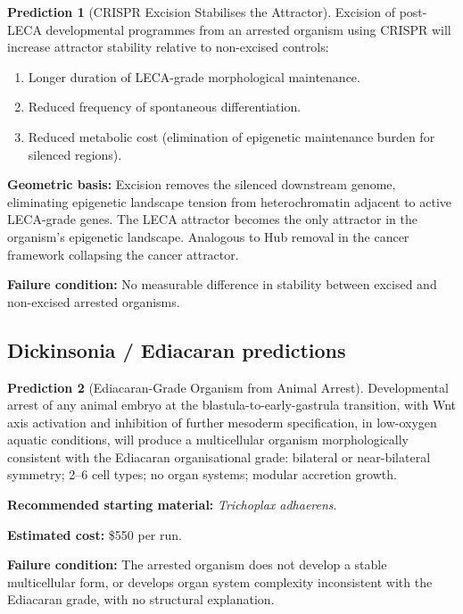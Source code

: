 \documentclass[12pt, a4paper]{article}
\theoremstyle{definition}
\newtheorem{prediction}{Prediction}[section]
\theoremstyle{remark}
\begin{document}
\begin{prediction}[CRISPR Excision Stabilises the Attractor]
Excision of post-LECA developmental programmes from an
arrested organism using CRISPR will increase attractor
stability relative to non-excised controls:
\begin{enumerate}[label=(\alph*)]
  \item Longer duration of LECA-grade morphological
        maintenance.
  \item Reduced frequency of spontaneous differentiation.
  \item Reduced metabolic cost (elimination of epigenetic
        maintenance burden for silenced regions).
\end{enumerate}

\textbf{Geometric basis:} Excision removes the silenced
downstream genome, eliminating epigenetic landscape tension
from heterochromatin adjacent to active LECA-grade genes.
The LECA attractor becomes the only attractor in the
organism's epigenetic landscape. Analogous to Hub removal
in the cancer framework collapsing the cancer attractor.

\textbf{Failure condition:} No measurable difference in
stability between excised and non-excised arrested organisms.
\end{prediction}

\subsection{Dickinsonia / Ediacaran predictions}

\begin{prediction}[Ediacaran-Grade Organism from Animal Arrest]
Developmental arrest of any animal embryo at the
blastula-to-early-gastrula transition, with Wnt axis
activation and inhibition of further mesoderm specification,
in low-oxygen aquatic conditions, will produce a
multicellular organism morphologically consistent with the
Ediacaran organisational grade: bilateral or near-bilateral
symmetry; 2--6 cell types; no organ systems; modular
accretion growth.

\textbf{Recommended starting material:}
\textit{Trichoplax adhaerens}.

\textbf{Estimated cost:} \$550 per run.

\textbf{Failure condition:} The arrested organism does not
develop a stable multicellular form, or develops organ
system complexity inconsistent with the Ediacaran grade,
with no structural explanation.
\end{prediction}
\end{document}
